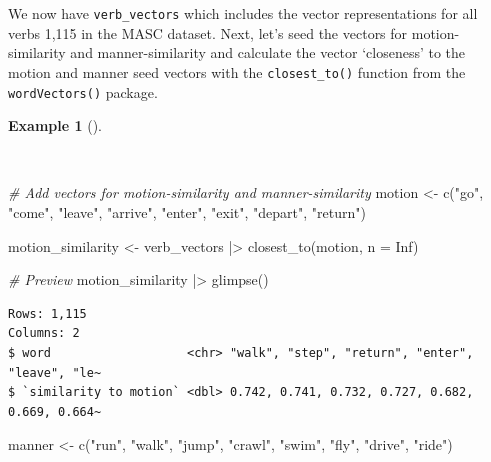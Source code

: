\documentclass[
  letterpaper,
  krantz1]{latex/krantz-mod}
\newenvironment{Shaded}{\begin{snugshade}}{\end{snugshade}}
\newcommand{\AttributeTok}[1]{\textcolor[rgb]{0.00,0.00,0.00}{#1}}
\newcommand{\CommentTok}[1]{\textcolor[rgb]{0.00,0.00,0.00}{\textit{#1}}}
\newcommand{\ConstantTok}[1]{\textcolor[rgb]{0.00,0.00,0.00}{#1}}
\newcommand{\FunctionTok}[1]{\textcolor[rgb]{0.00,0.00,0.00}{#1}}
\newcommand{\NormalTok}[1]{\textcolor[rgb]{0.00,0.00,0.00}{#1}}
\newcommand{\OtherTok}[1]{\textcolor[rgb]{0.00,0.00,0.00}{#1}}
\newcommand{\SpecialCharTok}[1]{\textcolor[rgb]{0.00,0.00,0.00}{#1}}
\newcommand{\StringTok}[1]{\textcolor[rgb]{0.00,0.00,0.00}{#1}}
\theoremstyle{definition}
\newtheorem{example}{Example}[chapter]
\theoremstyle{definition}
\theoremstyle{remark}
\begin{document}
We now have \texttt{verb\_vectors} which includes the vector
representations for all verbs 1,115 in the MASC dataset. Next, let's
seed the vectors for motion-similarity and manner-similarity and
calculate the vector `closeness' to the motion and manner seed vectors
with the \texttt{closest\_to()} function from the \texttt{wordVectors()}
package.

\begin{example}[]\protect\hypertarget{exm-explore-masc-vsm-word2vec-manner-motion}{}\label{exm-explore-masc-vsm-word2vec-manner-motion}

~

\begin{Shaded}
\begin{Highlighting}[numbers=left,,]
\CommentTok{\# Add vectors for motion{-}similarity and manner{-}similarity}
\NormalTok{motion }\OtherTok{\textless{}{-}}
  \FunctionTok{c}\NormalTok{(}\StringTok{"go"}\NormalTok{, }\StringTok{"come"}\NormalTok{, }\StringTok{"leave"}\NormalTok{, }\StringTok{"arrive"}\NormalTok{, }\StringTok{"enter"}\NormalTok{, }\StringTok{"exit"}\NormalTok{, }\StringTok{"depart"}\NormalTok{, }\StringTok{"return"}\NormalTok{)}

\NormalTok{motion\_similarity }\OtherTok{\textless{}{-}}
\NormalTok{  verb\_vectors }\SpecialCharTok{|\textgreater{}} \FunctionTok{closest\_to}\NormalTok{(motion, }\AttributeTok{n =} \ConstantTok{Inf}\NormalTok{)}

\CommentTok{\# Preview}
\NormalTok{motion\_similarity }\SpecialCharTok{|\textgreater{}} \FunctionTok{glimpse}\NormalTok{()}
\end{Highlighting}
\end{Shaded}

\begin{verbatim}
Rows: 1,115
Columns: 2
$ word                   <chr> "walk", "step", "return", "enter", "leave", "le~
$ `similarity to motion` <dbl> 0.742, 0.741, 0.732, 0.727, 0.682, 0.669, 0.664~
\end{verbatim}

\begin{Shaded}
\begin{Highlighting}[numbers=left,,]
\NormalTok{manner }\OtherTok{\textless{}{-}}
  \FunctionTok{c}\NormalTok{(}\StringTok{"run"}\NormalTok{, }\StringTok{"walk"}\NormalTok{, }\StringTok{"jump"}\NormalTok{, }\StringTok{"crawl"}\NormalTok{, }\StringTok{"swim"}\NormalTok{, }\StringTok{"fly"}\NormalTok{, }\StringTok{"drive"}\NormalTok{, }\StringTok{"ride"}\NormalTok{)}


\end{Highlighting}
\end{Shaded}
\end{example}
\end{document}
